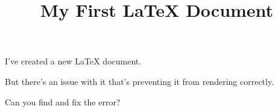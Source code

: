 \documentclass{article}
\begin{document}


\title{My First LaTeX Document}

I've created a new LaTeX document.

But there's an issue with it that's preventing it from rendering correctly.

Can you find and fix the error?
\end{document}
